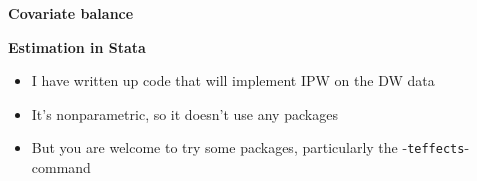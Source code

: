 \documentclass[notes=show]{beamer}
\begin{document}
\begin{frame}[plain]

	\begin{center}
	\textbf{Covariate balance}
	\end{center}

\begin{figure}[h]
\end{figure}


\end{frame}


\begin{frame}[plain]
	\begin{center}
	\textbf{Estimation in Stata}
	\end{center}
	
	\begin{itemize}
	\item I have written up code that will implement IPW on the DW data
	\item It's nonparametric, so it doesn't use any packages
	\item But you are welcome to try some packages, particularly the -\texttt{teffects}- command
	\end{itemize}
	
\end{frame}
\end{document}
